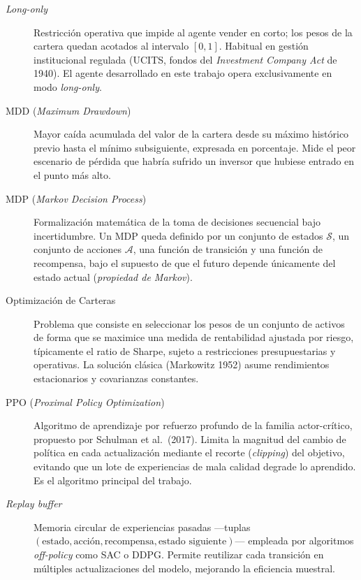 \documentclass[IB,a4paper]{TFUOC}
\begin{document}
\begin{description}
    \item[\textit{Long-only}] Restricción operativa que impide al agente vender en corto; los pesos de la cartera quedan acotados al intervalo $[0,1]$. Habitual en gestión institucional regulada (UCITS, fondos del \textit{Investment Company Act} de 1940). El agente desarrollado en este trabajo opera exclusivamente en modo \textit{long-only}.

    \item[MDD (\textit{Maximum Drawdown})] Mayor caída acumulada del valor de la cartera desde su máximo histórico previo hasta el mínimo subsiguiente, expresada en porcentaje. Mide el peor escenario de pérdida que habría sufrido un inversor que hubiese entrado en el punto más alto.

    \item[MDP (\textit{Markov Decision Process})] Formalización matemática de la toma de decisiones secuencial bajo incertidumbre. Un MDP queda definido por un conjunto de estados $\mathcal{S}$, un conjunto de acciones $\mathcal{A}$, una función de transición y una función de recompensa, bajo el supuesto de que el futuro depende únicamente del estado actual (\textit{propiedad de Markov}).

    \item[Optimización de Carteras] Problema que consiste en seleccionar los pesos de un conjunto de activos de forma que se maximice una medida de rentabilidad ajustada por riesgo, típicamente el ratio de Sharpe, sujeto a restricciones presupuestarias y operativas. La solución clásica (Markowitz 1952) asume rendimientos estacionarios y covarianzas constantes.

    \item[PPO (\textit{Proximal Policy Optimization})] Algoritmo de aprendizaje por refuerzo profundo de la familia actor-crítico, propuesto por Schulman et al.\ (2017). Limita la magnitud del cambio de política en cada actualización mediante el recorte (\textit{clipping}) del objetivo, evitando que un lote de experiencias de mala calidad degrade lo aprendido. Es el algoritmo principal del trabajo.

    \item[\textit{Replay buffer}] Memoria circular de experiencias pasadas —tuplas $(\text{estado}, \text{acción}, \text{recompensa}, \text{estado siguiente})$— empleada por algoritmos \textit{off-policy} como SAC o DDPG. Permite reutilizar cada transición en múltiples actualizaciones del modelo, mejorando la eficiencia muestral.


\end{description}
\end{document}
